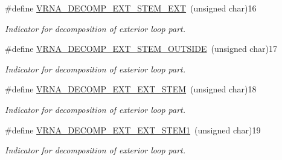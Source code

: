 \begin{DoxyCompactItemize}
\#define \mbox{\hyperlink{group__constraints_gabb09c5b78b75a44502fc77b950125c1e}{V\+R\+N\+A\+\_\+\+D\+E\+C\+O\+M\+P\+\_\+\+E\+X\+T\+\_\+\+S\+T\+E\+M\+\_\+\+E\+XT}}~(unsigned char)16
\begin{DoxyCompactList}\small\item\em Indicator for decomposition of exterior loop part. \end{DoxyCompactList}\item 
\#define \mbox{\hyperlink{group__constraints_gae7554cd3ff089360c02e4920229e221c}{V\+R\+N\+A\+\_\+\+D\+E\+C\+O\+M\+P\+\_\+\+E\+X\+T\+\_\+\+S\+T\+E\+M\+\_\+\+O\+U\+T\+S\+I\+DE}}~(unsigned char)17
\begin{DoxyCompactList}\small\item\em Indicator for decomposition of exterior loop part. \end{DoxyCompactList}\item 
\#define \mbox{\hyperlink{group__constraints_ga06efd054c9271438f6d82d4559d9e69f}{V\+R\+N\+A\+\_\+\+D\+E\+C\+O\+M\+P\+\_\+\+E\+X\+T\+\_\+\+E\+X\+T\+\_\+\+S\+T\+EM}}~(unsigned char)18
\begin{DoxyCompactList}\small\item\em Indicator for decomposition of exterior loop part. \end{DoxyCompactList}\item 
\#define \mbox{\hyperlink{group__constraints_ga2e75d7a77118735b32f25422d9686719}{V\+R\+N\+A\+\_\+\+D\+E\+C\+O\+M\+P\+\_\+\+E\+X\+T\+\_\+\+E\+X\+T\+\_\+\+S\+T\+E\+M1}}~(unsigned char)19
\begin{DoxyCompactList}\small\item\em Indicator for decomposition of exterior loop part. \end{DoxyCompactList}\end{DoxyCompactItemize}
